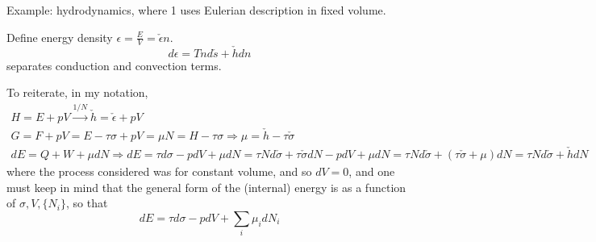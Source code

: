 \documentclass[10pt]{amsart}
\begin{document}
\begin{multicols*}{2}
\begin{enumerate}
Example: hydrodynamics, where 1 uses Eulerian description in fixed volume. 

Define energy density $\epsilon = \frac{E}{V} = \check{\epsilon}n$. 
\[
d\epsilon = Tn d\check{s} + \check{h} dn
\]
separates conduction and convection terms.  

To reiterate, in my notation,
\[
\begin{gathered}
  H = E + pV \xrightarrow{ 1/N} \check{h} = \check{\epsilon} + pV \\ 
  G = F+ pV = E-\tau \sigma + pV = \mu N = H-\tau \sigma \Longrightarrow \mu = \check{h} - \tau \check{\sigma}\\
  dE = Q + W + \mu dN \Longrightarrow dE = \tau d\sigma - pdV + \mu dN = \tau N d\check{\sigma} + \tau \check{\sigma}dN - pdV + \mu dN = \tau N d\check{\sigma} + (\tau \check{\sigma} + \mu ) dN = \tau N d\check{\sigma} + \check{h} dN
\end{gathered}
\]
where the process considered was for constant volume, and so $dV=0$, and one must keep in mind that the general form of the (internal) energy is as a function of $\sigma, V, \lbrace N_i \rbrace$, so that 
\[
dE = \tau d\sigma - pdV + \sum_i \mu_i dN_i
\]

\end{enumerate}










\end{multicols*}
\end{document}
